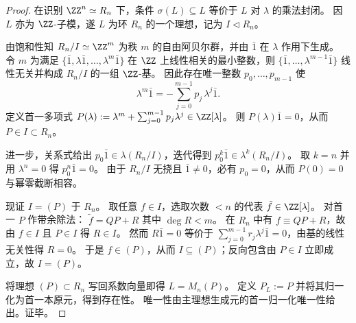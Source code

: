 \begin{proof}
在识别 \(\ZZ^n\simeq R_n\) 下，条件 \(\sigma(L)\subseteq L\) 等价于 \(L\) 对 \(\lambda\) 的乘法封闭。
因 \(L\) 亦为 \(\ZZ\)-子模，遂 \(L\) 为环 \(R_n\) 的一个理想，记为 \(I\triangleleft R_n\)。
\par
由饱和性知 \(R_n/I\simeq \ZZ^{m}\) 为秩 \(m\) 的自由阿贝尔群，并由 \(\bar 1\) 在 \(\lambda\) 作用下生成。
令 \(m\) 为满足 \(\{\bar 1,\lambda\bar 1,\dots,\lambda^{m}\bar 1\}\) 在 \(\ZZ\) 上线性相关的最小整数，则
\(\{\bar 1,\dots,\lambda^{m-1}\bar 1\}\) 线性无关并构成 \(R_n/I\) 的一组 \(\ZZ\)-基。
因此存在唯一整数 \(p_0,\dots,p_{m-1}\) 使
\[
\lambda^{m}\bar 1=-\sum_{j=0}^{m-1}p_j\,\lambda^{j}\bar 1.
\]
定义首一多项式
\(
P(\lambda):=\lambda^{m}+\sum_{j=0}^{m-1}p_j\lambda^{j}
 \in\ZZ[\lambda]
\)。
则 \(P(\lambda)\bar 1=0\)，从而 \(P\in I\subset R_n\)。
\par
进一步，关系式给出 \(p_0\bar 1\in \lambda(R_n/I)\)，迭代得到 \(p_0^k\bar 1\in\lambda^{k}(R_n/I)\)。
取 \(k=n\) 并用 \(\lambda^n=0\) 得 \(p_0^n\bar 1=0\)。
由于 \(R_n/I\) 无挠且 \(\bar 1\neq 0\)，必有 \(p_0=0\)，从而 \(P(0)=0\) 与幂零截断相容。
\par
现证 \(I=(P)\) 于 \(R_n\)。
取任意 \(f\in I\)，选取次数 \(<n\) 的代表 \(\tilde f\in\ZZ[\lambda]\)。
对首一 \(P\) 作带余除法：
\(
\tilde f=QP+R
\)
其中 \(\deg R<m\)。
在 \(R_n\) 中有 \(f\equiv QP+R\)，故由 \(f\in I\) 且 \(P\in I\) 得 \(R\in I\)。
然而 \(R\bar 1=0\) 等价于 \(\sum_{j=0}^{m-1}r_j\lambda^j\bar 1=0\)，由基的线性无关性得 \(R=0\)。
于是 \(f\in(P)\)，从而 \(I\subseteq(P)\)；反向包含由 \(P\in I\) 立即成立，故 \(I=(P)\)。
\par
将理想 \((P)\subset R_n\) 写回系数向量即得 \(L=M_n(P)\)。
定义 \(P_L:=P\) 并将其归一化为首一本原元，得到存在性。
唯一性由主理想生成元的首一归一化唯一性给出。证毕。
\end{proof}


